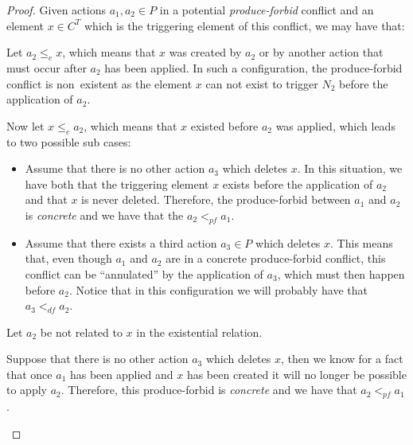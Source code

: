 
\begin{proof} Given actions $a_1,a_2 \in P$ in a potential \emph{produce-forbid} conflict and an element $x \in C^T$ which is the triggering element of this conflict, we may have that:
\hfill

\begin{description}[style=nextline,leftmargin=*]
  \item[Triggering element is related to the action:]
    Let $a_2 \leq_e x$, which means that $x$ was created by $a_2$ or by another action that must occur after $a_2$ has been applied. In such a configuration, the produce-forbid conflict is \mbox{non existent} as the element $x$ can not exist to trigger $N_2$ before the application of $a_2$.

    Now let $x \leq_e a_2$, which means that $x$ existed before $a_2$ was applied, which leads to two possible sub cases:

    \begin{itemize}
      \item Assume that there is no other action $a_3$ which deletes $x$. In this situation, we have both that the triggering element $x$ exists before the application of $a_2$ and that $x$ is never deleted. Therefore, the produce-forbid between $a_1$ and $a_2$ is \emph{concrete} and we have that the $a_2 <_{pf} a_1$.
      \item Assume that there exists a third action $a_3 \in P$ which deletes $x$. This means that, even though $a_1$ and $a_2$ are in a concrete produce-forbid conflict, this conflict can be ``annulated'' by the application of $a_3$, which must then happen before $a_2$. Notice that in this configuration we will probably have that $a_3 <_{df} a_2$.
    \end{itemize}

  \item[Triggering element is not related to the action:]
    Let $a_2$ be not related to $x$ in the existential relation.

    Suppose that there is no other action $a_3$ which deletes $x$, then we know for a fact that once $a_1$ has been applied and $x$ has been created it will no longer be possible to apply $a_2$. Therefore, this produce-forbid is \emph{concrete} and we have that $a_2 <_{pf} a_1$.


\end{description}
\end{proof}
